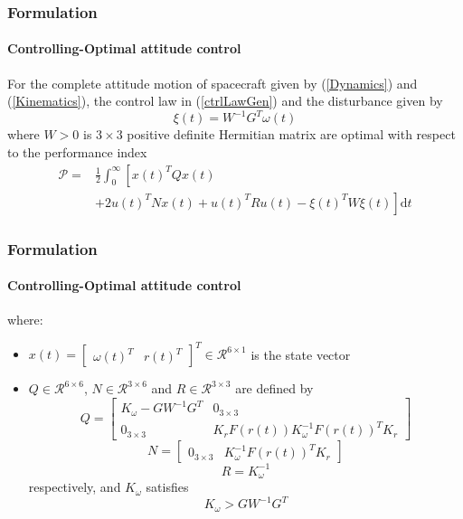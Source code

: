 \documentclass{beamer}
\begin{document}
\begin{frame}
\frametitle{Formulation}
\framesubtitle{Controlling-Optimal attitude control}
\begin{theorem}
	For the complete attitude motion of spacecraft given by (\ref{Dynamics}) and (\ref{Kinematics}), the control law in (\ref{ctrlLawGen}) and the disturbance given by
	\begin{equation}\label{Theorem 2 xi optimal}
	\xi(t)=W^{-1}G^{T}\omega(t)
	\end{equation}
	where $W>0$ is $3\times 3$ positive definite Hermitian matrix are optimal with respect to the performance index
	\begin{equation}\label{performanceIndex}
		\begin{split}
	\mathcal{P}=&\frac{1}{2}\int_{0}^{\infty}
	\left[x(t)^{T}Qx(t)\right.\\
	&\left.+2u(t)^{T}Nx(t)+u(t)^{T}Ru(t)-\xi(t)^{T}W\xi(t)\right]\mathrm{d}t
	\end{split}
	\end{equation}
\end{theorem}
\end{frame}

\begin{frame}
\frametitle{Formulation}
\framesubtitle{Controlling-Optimal attitude control}
\begin{theorem}
	where:\begin{itemize}
		\item $x(t)=\begin{bmatrix}
		\omega(t)^{T}&r(t)^{T}
		\end{bmatrix}^{T}\in \mathcal{R}^{6\times 1}$ is the state vector
		\item $Q\in \mathcal{R}^{6\times 6}$, $N \in \mathcal{R}^{3\times 6}$ and $R \in \mathcal{R}^{3\times 3}$ are defined by
		\begin{equation}\label{Q}
		Q=\begin{bmatrix}
		K_{\omega}-GW^{-1}G^{T}&0_{3\times 3}\\
		0_{3\times 3}&K_{r}F(r(t))K_{\omega}^{-1}F(r(t))^{T}K_{r}
		\end{bmatrix}
		\end{equation}
		\begin{equation}\label{N}
		N=
		\begin{bmatrix}
		0_{3\times 3}&K_{\omega}^{-1}F(r(t))^{T}K_{r}
		\end{bmatrix}
		\end{equation}
		\begin{equation}\label{R}
		R=K_{\omega}^{-1}
		\end{equation}
		respectively, and $K_{\omega}$ satisfies
		\begin{equation}\label{Performance Index Condition}
		K_{\omega}>GW^{-1}G^{T}
		\end{equation}
	\end{itemize}
\end{theorem}
\end{frame}
\end{document}
